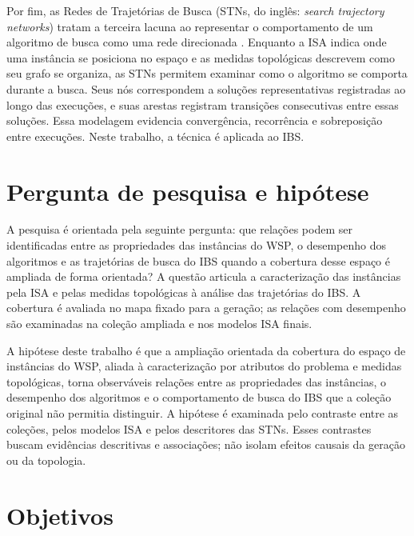 Por fim, as Redes de Trajetórias de Busca (STNs, do inglês:
\textit{search trajectory networks}) tratam a terceira lacuna ao representar
o comportamento de um algoritmo de busca como uma rede direcionada
\cite{ChaconSartoriEtAl2023,OchoaMalanBlum2021}. Enquanto a ISA indica onde uma
instância se posiciona no espaço e as medidas topológicas descrevem como seu
grafo se organiza, as STNs permitem examinar como o algoritmo se comporta durante
a busca. Seus nós correspondem a soluções representativas registradas ao longo das
execuções, e suas arestas registram transições consecutivas entre essas soluções.
Essa modelagem evidencia convergência, recorrência e sobreposição entre
execuções. Neste trabalho, a técnica é aplicada ao IBS.

\section{Pergunta de pesquisa e hipótese}\label{sec:pergunta-pesquisa}

A pesquisa é orientada pela seguinte pergunta: que relações podem ser
identificadas entre as propriedades das instâncias do WSP, o desempenho
dos algoritmos e as trajetórias de busca do IBS quando a cobertura desse
espaço é ampliada de forma orientada?
A questão articula a caracterização das instâncias pela ISA e pelas medidas
topológicas à análise das trajetórias do IBS. A cobertura é avaliada no
mapa fixado para a geração; as relações com desempenho são examinadas
na coleção ampliada e nos modelos ISA finais.

A hipótese deste trabalho é que a ampliação orientada da cobertura do
espaço de instâncias do WSP, aliada à caracterização por atributos do
problema e medidas topológicas, torna observáveis relações entre as
propriedades das instâncias, o desempenho dos algoritmos e o comportamento
de busca do IBS que a coleção original não permitia distinguir.
A hipótese é examinada pelo contraste entre as coleções, pelos modelos ISA
e pelos descritores das STNs. Esses contrastes buscam evidências descritivas
e associações; não isolam efeitos causais da geração ou da topologia.

\section{Objetivos}\label{sec:objetivos}

